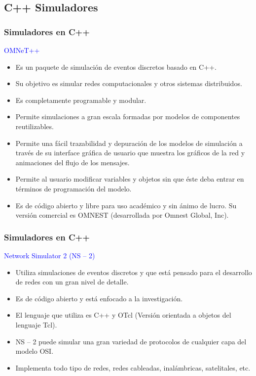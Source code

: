 \documentclass{beamer}
\begin{document}
\subsection{C++ Simuladores }

%
%
\begin{frame}[fragile] %
	
\frametitle{Simuladores en C++}
\textcolor{blue}{OMNeT++}
\begin{itemize}
	\item Es un paquete de simulación de eventos discretos basado en C++.
	\item Su objetivo es simular redes computacionales y otros sistemas distribuidos. 
	\item Es completamente programable y modular.
	\item Permite simulaciones a gran escala formadas por modelos de componentes reutilizables. 
	\item Permite una fácil trazabilidad y depuración de los modelos de simulación a través de su interface gráfica de usuario que muestra los gráficos de la red y animaciones del flujo de los mensajes.
	\item Permite al usuario modificar variables y objetos sin que éste deba entrar en términos de programación del modelo.
	\item Es de código abierto y libre para uso académico y sin ánimo de lucro. Su versión comercial es OMNEST (desarrollada por Omnest Global, Inc).
	
\end{itemize}

\end{frame}
%
%
\begin{frame}
\frametitle{Simuladores en C++}
\textcolor{blue}{Network Simulator 2 (NS – 2)}
\vspace{0.5cm}
\begin{itemize}
	\item Utiliza simulaciones de eventos discretos y que está pensado para el desarrollo de redes con un gran nivel de detalle. 
	\item Es de código abierto y está enfocado a la investigación.
	\item El lenguaje que utiliza es C++ y OTcl (Versión orientada a objetos del lenguaje Tcl).
	\item NS – 2 puede simular una gran variedad de protocolos de cualquier capa del modelo OSI.
	\item Implementa todo tipo de redes, redes cableadas, inalámbricas, satelitales, etc.
\end{itemize}


\end{frame}
\end{document}
